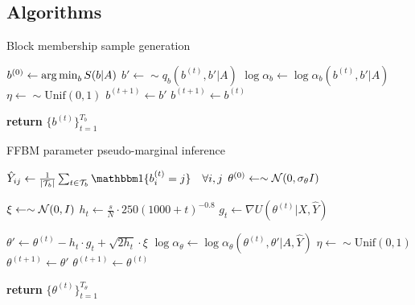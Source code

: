 \subsection{Algorithms}
\label{appdx:algorithms}

\begin{algorithm} %
	\caption{Block membership sample generation} %
	\label{alg:b-samples} %
	\begin{algorithmic} %
		\State $b^{(0)} \gets \operatorname*{arg\,min}_b S(b|A)$ 
		\State $b' \gets \sim q_b(b^{(t)}, b' | A)$
		\State $\log \alpha_b \gets \log \alpha_b(b^{(t)}, b' | A)$
		\State $\eta \gets \sim \textrm{Unif}(0,1)$
		\State $b^{(t+1)} \gets b'$
		\Else
		\State $b^{(t+1)} \gets b^{(t)}$
		\EndIf
		\EndFor
		
		\State \textbf{return} $\{b^{(t)}\}_{t=1}^{T_b}$
		\EndProcedure
	\end{algorithmic}
\end{algorithm}

\begin{algorithm} %
	\caption{FFBM parameter pseudo-marginal inference} %
	\label{alg:theta-samples} %
	\begin{algorithmic} %
		\State $\hat{Y}_{ij} \gets \frac{1}{|\Tcal_b|} \sum_{t \in \Tcal_b} \one \{ b^{(t)}_i = j\} \quad \forall i,j$
		\State $\theta^{(0)} \gets \sim \mathcal{N}(0, \sigma_\theta I)$
		
		\item[]
		
		\State $\xi \gets \sim \mathcal{N}(0, I)$
		\State $h_t \gets \frac{s}{N} \cdot 250(1000 + t)^{-0.8}$
		\State $g_t \gets \nabla U(\theta^{(t)}| X, \hat{Y})$
		\item[]
		\State $\theta' \gets \theta^{(t)} - h_t \cdot g_t + \sqrt{2h_t} \cdot \xi$
		\State $\log \alpha_\theta \gets \log \alpha_\theta(\theta^{(t)}, \theta' | A, \hat{Y})$
		\State $\eta \gets \sim \textrm{Unif}(0,1)$
		\If{$\log \eta < \log \alpha_\theta$}
		\State $\theta^{(t+1)} \gets \theta'$
		\Else
		\State $\theta^{(t+1)} \gets \theta^{(t)}$
		\EndIf
		\EndFor
		
		\State \textbf{return} $\{\theta^{(t)}\}_{t=1}^{T_\theta}$
		\EndProcedure
	\end{algorithmic}
\end{algorithm}

